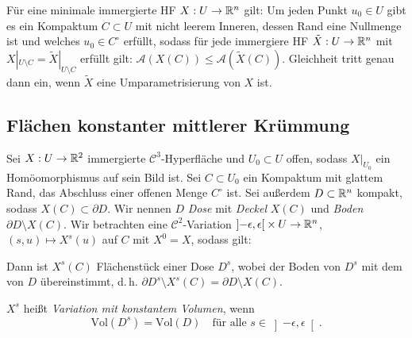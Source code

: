 \documentclass{cheat-sheet}
\newcommand{\A}{\mathcal{A}}
\begin{document}
\begin{samepage}

\begin{satz}
  Für eine minimale immergierte HF $X : U \to \mathbb{R}^n$ gilt: Um jeden Punkt $u_0 \in U$ gibt es ein Kompaktum $C \subset U$ mit nicht leerem Inneren, dessen Rand eine Nullmenge ist und welches $u_0 \in C^\circ$ erfüllt, sodass für jede immergiere HF $\tilde{X} : U \to \mathbb{R}^n$ mit $X|_{U \setminus C} = \tilde{X}|_{U \setminus C}$ erfüllt gilt: $\A(X(C)) \leq \A(\tilde{X}(C))$. Gleichheit tritt genau dann ein, wenn $\tilde{X}$ eine Umparametrisierung von $X$ ist.
\end{satz}



\subsection{Flächen konstanter mittlerer Krümmung}

\end{samepage}

\begin{situation}
  Sei $X : U \to \mathbb{R}^2$ immergierte $\mathcal{C}^3$-Hyperfläche und $U_0 \subset U$ offen, sodass $X|_{U_0}$ ein Homöomorphismus auf sein Bild ist. Sei $C \subset U_0$ ein Kompaktum mit glattem Rand, das Abschluss einer offenen Menge $C^\circ$ ist. Sei außerdem $D \subset \mathbb{R}^n$ kompakt, sodass $X(C) \subset \partial D$. Wir nennen $D$ \emph{Dose} mit \emph{Deckel} $X(C)$ und \emph{Boden} $\partial D \setminus X(C)$. Wir betrachten eine $\mathcal{C}^2$-Variation $\left] -\epsilon, \epsilon \right[ \times U \to \mathbb{R}^n$, $(s, u) \mapsto X^s(u)$ auf $C$ mit $X^0 = X$, sodass gilt:

  \begin{itemize}
    \miniitem{0.6 \linewidth}{$\fa{s \in \left] -\epsilon, \epsilon \right[} X^s|_{U_0}$ ist eine Einbettung}
  \end{itemize}

  Dann ist $X^s(C)$ Flächenstück einer Dose $D^s$, wobei der Boden von $D^s$ mit dem von $D$ übereinstimmt, d.\,h. $\partial D^s \setminus X^s(C) = \partial D \setminus X(C)$.
\end{situation}

\begin{defn}
  $X^s$ heißt \emph{Variation mit konstantem Volumen}, wenn
  \[
    \mathrm{Vol}(D^s) = \mathrm{Vol}(D)
    \quad \text{für alle $s \in \left] -\epsilon, \epsilon \right[$}.
  \]
\end{defn}
\end{document}
